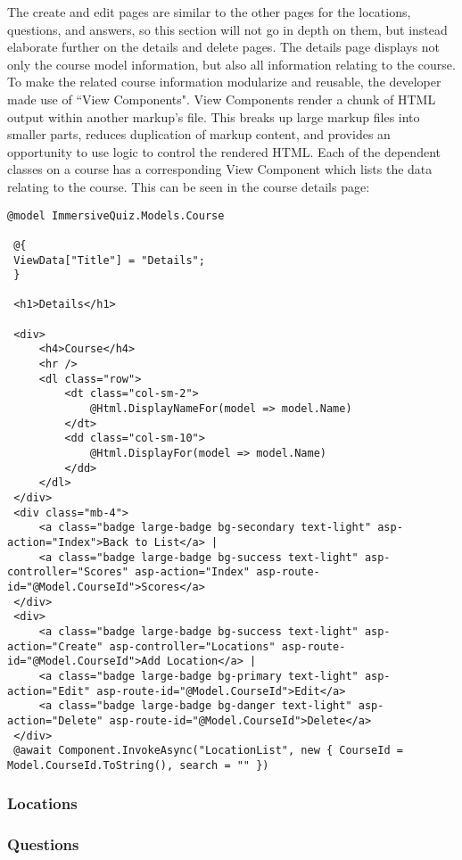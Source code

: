  The create and edit pages are similar to the other pages for the locations, questions, and answers, so this section will not go in depth on them, but instead elaborate further on the details and delete pages. The details page displays not only the course model information, but also all information relating to the course. To make the related course information modularize and reusable, the developer made use of ``View Components". View Components render a chunk of HTML output within another markup's file. This breaks up large markup files into smaller parts, reduces duplication of markup content, and provides an opportunity to use logic to control the rendered HTML. Each of the dependent classes on a course has a corresponding View Component which lists the data relating to the course. This can be seen in the course details page:
 \begin{lstlisting}[caption=Course Details Razor Page, label=lst:CourseDetails]
 @model ImmersiveQuiz.Models.Course
 
 @{
 ViewData["Title"] = "Details";
 }
 
 <h1>Details</h1>
 
 <div>
	 <h4>Course</h4>
	 <hr />
	 <dl class="row">
		 <dt class="col-sm-2">
			 @Html.DisplayNameFor(model => model.Name)
		 </dt>
		 <dd class="col-sm-10">
			 @Html.DisplayFor(model => model.Name)
		 </dd>
	 </dl>
 </div>
 <div class="mb-4">
	 <a class="badge large-badge bg-secondary text-light" asp-action="Index">Back to List</a> |
	 <a class="badge large-badge bg-success text-light" asp-controller="Scores" asp-action="Index" asp-route-id="@Model.CourseId">Scores</a>
 </div>
 <div>
	 <a class="badge large-badge bg-success text-light" asp-action="Create" asp-controller="Locations" asp-route-id="@Model.CourseId">Add Location</a> |
	 <a class="badge large-badge bg-primary text-light" asp-action="Edit" asp-route-id="@Model.CourseId">Edit</a>
	 <a class="badge large-badge bg-danger text-light" asp-action="Delete" asp-route-id="@Model.CourseId">Delete</a> 
 </div>
 @await Component.InvokeAsync("LocationList", new { CourseId = Model.CourseId.ToString(), search = "" })
 \end{lstlisting}
 
\subsubsection{Locations}

\subsubsection{Questions}

